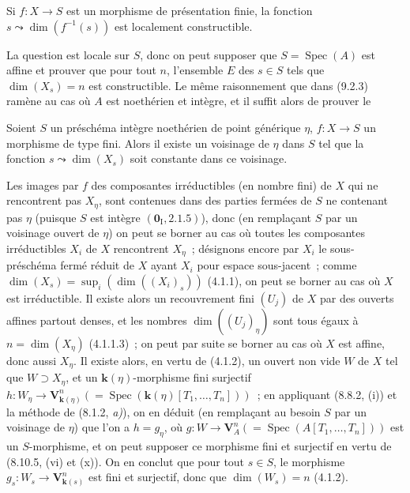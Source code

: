 \begin{proposition}[9.2.6.1]
\label{IV.9.2.6.1-fr}
Si $f:X\to S$ est un morphisme de présentation finie, la fonction
$s\leadsto\dim(f^{-1}(s))$ est localement constructible.
\end{proposition}

La question est locale sur $S$, donc on peut supposer que
$S=\operatorname{Spec}(A)$ est affine et prouver que pour tout $n$, l'ensemble
$E$ des $s\in S$ tels que $\dim(X_s)=n$ est constructible. Le même
raisonnement que dans (9.2.3) ramène au cas où $A$ est noethérien et intègre,
et il suffit alors de prouver le

\begin{corollary}[9.2.6.2]
\label{IV.9.2.6.2-fr}
Soient $S$ un préschéma intègre noethérien de point générique $\eta$,
$f:X\to S$ un morphisme de type fini. Alors il existe un voisinage de $\eta$
dans $S$ tel que la fonction $s\leadsto\dim(X_s)$ soit constante dans ce
voisinage.
\end{corollary}

Les images par $f$ des composantes irréductibles (en nombre fini) de $X$ qui
ne rencontrent pas $X_\eta$, sont contenues dans des parties fermées de $S$ ne
contenant pas $\eta$ (puisque $S$ est intègre
$(\mathbf 0_{\mathrm I},2.1.5)$), donc (en remplaçant $S$ par un voisinage
ouvert de $\eta$) on peut se borner au cas où toutes les composantes
irréductibles $X_i$ de $X$ rencontrent $X_\eta$~; désignons encore par $X_i$
le sous-préschéma fermé réduit de $X$ ayant $X_i$ pour espace sous-jacent~;
comme $\dim(X_s)=\sup_i(\dim((X_i)_s))$ (4.1.1), on peut se borner au cas où
$X$ est irréductible. Il existe alors un recouvrement fini $(U_j)$ de $X$ par
des
ouverts affines partout denses, et les nombres $\dim((U_j)_\eta)$ sont tous
égaux à $n=\dim(X_\eta)$ (4.1.1.3)~; on peut par suite se borner au cas où $X$
est affine, donc aussi $X_\eta$. Il existe alors, en vertu de (4.1.2), un
ouvert non vide $W$ de $X$ tel que $W\supset X_\eta$, et un
$\boldsymbol{k}(\eta)$-morphisme fini surjectif
$h:W_\eta\to\mathbf V_{\mathbf{k}(\eta)}^n
(=\operatorname{Spec}(\boldsymbol{k}(\eta)[T_1,\ldots,T_n]))$~; en appliquant
(8.8.2, (i)) et la méthode de (8.1.2, \emph{a)}), on en déduit (en remplaçant
au besoin $S$ par un voisinage de $\eta$) que l'on a $h=g_\eta$, où
$g:W\to\mathbf V_A^n(=\operatorname{Spec}(A[T_1,\ldots,T_n]))$ est un
$S$-morphisme, et on peut supposer ce morphisme fini et surjectif en vertu de
(8.10.5, (vi) et (x)). On en conclut que pour tout $s\in S$, le morphisme
$g_s:W_s\to\mathbf V_{\mathbf{k}(s)}^n$ est fini et surjectif, donc que
$\dim(W_s)=n$ (4.1.2).

